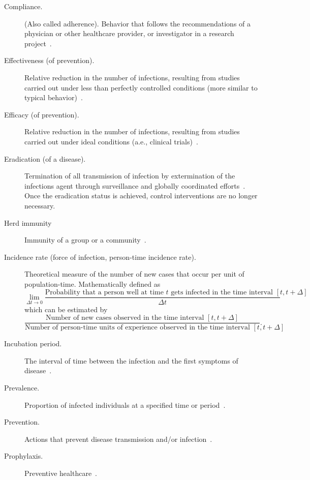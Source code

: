 \begin{description} 
	\item[Compliance.] (Also called adherence). Behavior that follows the recommendations of a physician or other healthcare provider, or investigator in a research project~\cite[]{Porta2014}.
	\item[Effectiveness (of prevention).] Relative reduction in the number of infections, resulting from studies carried out under less than perfectly controlled conditions (more similar to typical behavior)~\cite[]{CDC_Epidemiology}.
	\item[Efficacy (of prevention).] Relative reduction in the number of infections, resulting from studies carried out under ideal conditions (a.e., clinical trials)~\cite[]{CDC_Epidemiology}.
	\item[Eradication (of a disease).] Termination of all transmission of infection by extermination of the infections agent through surveillance and globally coordinated efforts~\cite[]{Porta2014}. Once the eradication status is achieved, control interventions are no longer necessary.
	\item[Herd immunity]Immunity of a group or a community~\cite[]{Porta2014}.
	\item[Incidence rate (force of infection, person-time incidence rate).] Theoretical measure of the number of new cases that occur per unit of population-time. Mathematically defined as~\cite[]{Porta2014}
	\[
	\lim_{\Delta t \to 0}\frac{\text{Probability that a person well at time } t \text{ gets infected in the time interval } [t,t+\Delta]}{\Delta t}
	\]
	which can be estimated by
	\[
	\frac{\text{Number of new cases observed in the time interval } [t,t+\Delta]}{\text{Number of person-time units of experience observed in the time interval } [t,t+\Delta]}.
	\]
	\item[Incubation period.] The interval of time between the infection and the first symptoms of disease~\cite[]{Porta2014}.
	\item[Prevalence.] Proportion of infected individuals at a specified time or period~\cite[]{Porta2014}.
	\item[Prevention.] Actions that prevent disease transmission and/or infection~\cite[]{Porta2014}.
	\item[Prophylaxis.] Preventive healthcare~\cite[]{Porta2014}.
\end{description}



